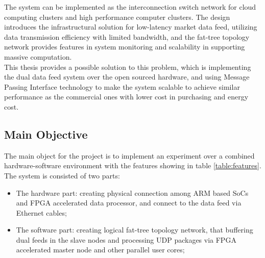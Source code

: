 \documentclass[11pt,openright,a4paper]{report}
\begin{document}
The system can be implemented as the interconnection switch network for cloud computing clusters and high performance computer clusters. The design introduces the infrastructural solution for low-latency market data feed, utilizing data transmission efficiency with limited bandwidth, and the fat-tree topology network provides features in system monitoring and scalability in supporting massive computation.\\  
This thesis provides a possible solution to this problem, which is implementing the dual data feed system over the open sourced hardware, and using Message Passing Interface technology to make the system scalable to achieve similar performance as the commercial ones with lower cost in purchasing and energy cost.\\
\subsection{Main Objective}
The main object for the project is to implement an experiment over a combined hardware-software environment with the features showing in table \ref{table:features}. The system is consisted of two parts:\\
\begin{itemize}
	\item The hardware part: creating physical connection among ARM based SoCs and FPGA accelerated data processor, and connect to the data feed via Ethernet cables;
	\item The software part: creating logical fat-tree topology network, that buffering dual feeds in the slave nodes and processing UDP packages via FPGA accelerated master node and other parallel user cores; 
\end{itemize}
\end{document}
